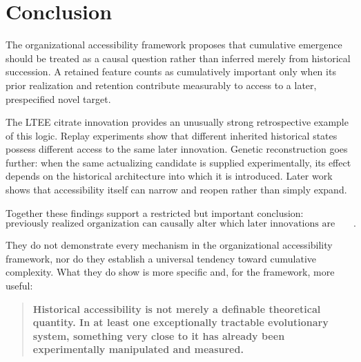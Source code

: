 \documentclass[11pt]{article}
\begin{document}
\section{Conclusion}

The organizational accessibility framework proposes that cumulative emergence should be treated as a causal question rather than inferred merely from historical succession. A retained feature counts as cumulatively important only when its prior realization and retention contribute measurably to access to a later, prespecified novel target.

The LTEE citrate innovation provides an unusually strong retrospective example of this logic. Replay experiments show that different inherited historical states possess different access to the same later innovation. Genetic reconstruction goes further: when the same actualizing candidate is supplied experimentally, its effect depends on the historical architecture into which it is introduced. Later work shows that accessibility itself can narrow and reopen rather than simply expand.

Together these findings support a restricted but important conclusion:
\[
\boxed{\text{previously realized organization can causally alter which later innovations are accessible}.}
\]

They do not demonstrate every mechanism in the organizational accessibility framework, nor do they establish a universal tendency toward cumulative complexity. What they do show is more specific and, for the framework, more useful:

\begin{quote}
\textbf{Historical accessibility is not merely a definable theoretical quantity. In at least one exceptionally tractable evolutionary system, something very close to it has already been experimentally manipulated and measured.}
\end{quote}
\end{document}
